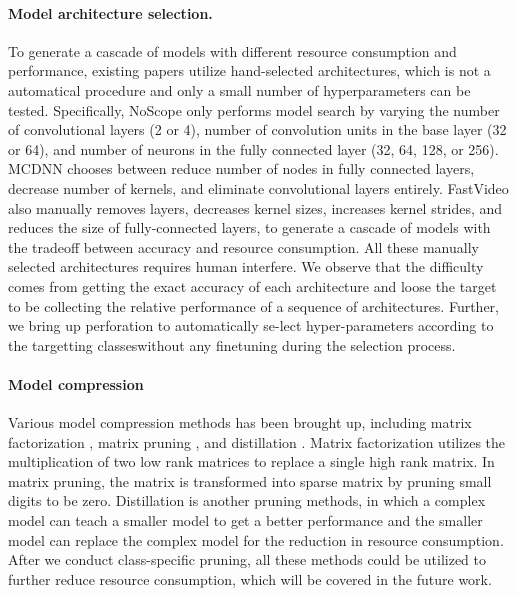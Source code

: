 \documentclass[pageno]{jpaper}
\begin{document}
\paragraph{Model architecture selection.}
To generate a cascade of models with different resource consumption and performance, existing papers utilize hand-selected architectures, which is not a automatical procedure and only a small number of hyperparameters can be tested. Specifically, NoScope \cite{kang2017noscope} only performs model search by varying the number of convolutional layers (2 or 4), number of convolution units in the base layer (32 or 64), and number of neurons in the fully connected layer (32, 64, 128, or 256). MCDNN \cite{han2016mcdnn} chooses between reduce number of nodes in fully connected layers, decrease number of kernels, and eliminate convolutional layers entirely. FastVideo \cite{shen2016fast} also manually removes layers, decreases kernel sizes, increases kernel strides, and reduces the size of fully-connected layers, to generate a cascade of models with the tradeoff between accuracy and resource consumption. All these manually selected architectures requires human interfere. We observe that the difficulty comes from getting the exact accuracy of each architecture and loose the target to be collecting the relative performance of a sequence of architectures. Further, we bring up perforation to automatically se-lect hyper-parameters according to the targetting classeswithout any finetuning during the selection process.


\paragraph{Model compression}
Various model compression methods has been brought up, including matrix factorization \cite{jaderberg2014speeding, kim2015compression, romero2014fitnets, xue2014singular}, matrix pruning \cite{chen2015compressing, han2015learning}, and distillation \cite{hinton2015distilling, ba2014deep, dauphin2013big, chen2017learning, lopez2015unifying, kim2015compression,bucilu2006model}. Matrix factorization utilizes the multiplication of two low rank matrices to replace a single high rank matrix. In matrix pruning, the matrix is transformed into sparse matrix by pruning small digits to be zero. Distillation is another pruning methods, in which a complex model can teach a smaller model to get a better performance and the smaller model can replace the complex model for the reduction in resource consumption. After we conduct class-specific pruning, all these methods could be utilized to further reduce resource consumption, which will be covered in the future work.
\end{document}
